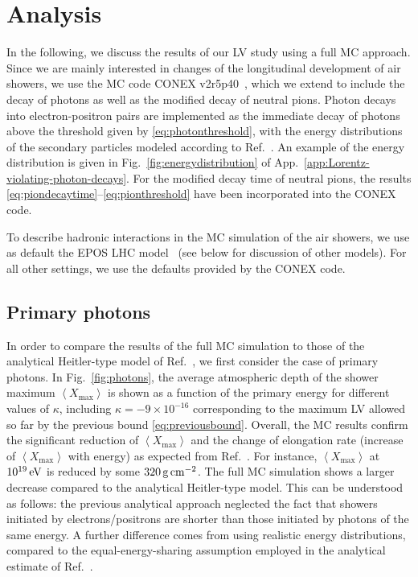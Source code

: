 \documentclass[aps,prd,preprint,longbibliography]{revtex4-1}
\begin{document}
\section{Analysis}
\label{sec:analysis}

In the following, we discuss the results of our LV study using a full MC
approach. Since we are mainly interested in changes of the
longitudinal development of air showers, we use the MC code CONEX v2r5p40~\cite{BergmannEngelHeckKalmykovOstapchenkoPierogThouwWerner2007,PierogAlekseevaBergmannChernatkinEngelHeckKalmykovMoyonOstapchenkoThouwWerner2006}, which we extend to
include the decay of photons as well as the modified decay of
neutral pions. Photon decays into electron-positron pairs
are implemented as the immediate decay of
photons above the threshold given by \eqref{eq:photonthreshold},
with the energy distributions of the secondary particles modeled
according to Ref.~\cite{DiazKlinkhamer2015}.
An example of the energy distribution is given in
Fig.~\ref{fig:energydistribution} of App.~\ref{app:Lorentz-violating-photon-decays}.
For the modified decay time of neutral pions,
the results \eqref{eq:piondecaytime}--\eqref{eq:pionthreshold}
have been incorporated into the CONEX code.

To describe hadronic interactions in the MC simulation of the air
showers, we use as default the EPOS LHC model~\cite{PierogKarpenkoKatzyYatsenkoWerner2015}
(see below for discussion of other models).
For all other settings, we use the defaults provided by the CONEX code.


\subsection{Primary photons}
\label{subsec:photons}

In order to compare the results of the full MC simulation to those
of the analytical Heitler-type model of Ref.~\cite{DiazKlinkhamerRisse2016}, we first consider
the case of primary photons.
In Fig.~\ref{fig:photons}, the average atmospheric depth of the shower
maximum $\left<X_\text{max}\right>$ is shown as a function
of the primary energy for different values of $\kappa$,
including $\kappa = -9 \times 10^{-16}$ corresponding to
the maximum LV allowed so far
by the previous bound \eqref{eq:previousbound}.
Overall, the MC results confirm
the significant reduction of $\left<X_\text{max}\right>$ and the change of elongation rate
(increase of $\left<X_\text{max}\right>$ with energy)
as expected from Ref.~\cite{DiazKlinkhamerRisse2016}.
For instance, $\left<X_\text{max}\right>$ at $\unit[10^{19}]{eV}$
is reduced by some $\unit[320]{g\,cm^{-2}}$.
The full MC simulation shows a larger decrease compared to
the analytical Heitler-type model.
This can be understood as follows:
the previous analytical approach neglected the fact
that showers initiated
by electrons/positrons are shorter than those initiated by photons of
the same energy.
A further difference comes from using
realistic energy distributions, compared
to the equal-energy-sharing assumption employed
in the analytical estimate
of Ref.~\cite{DiazKlinkhamerRisse2016}.
\end{document}
